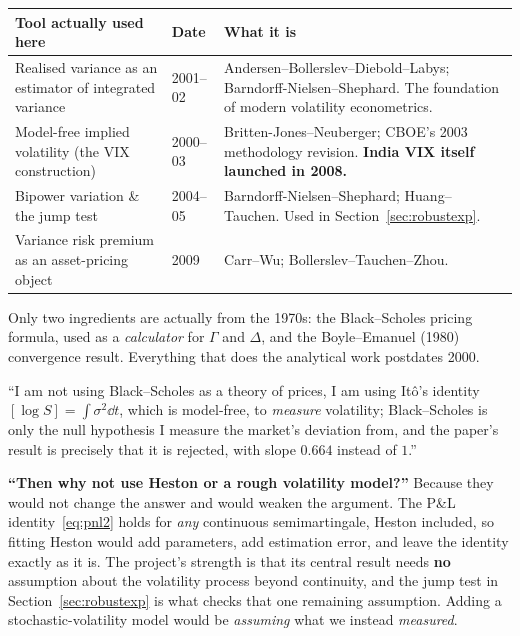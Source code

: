 \documentclass[11pt,a4paper]{article}
\begin{document}
\begin{keybox}
\begin{table}[H]
\centering\small
\begin{tabular}{L{6.2cm}L{1.9cm}L{6.9cm}}
\toprule
\textbf{Tool actually used here} & \textbf{Date} & \textbf{What it is} \\
\midrule
Realised variance as an estimator of integrated variance & 2001--02 &
Andersen--Bollerslev--Diebold--Labys; Barndorff-Nielsen--Shephard. The foundation of modern
volatility econometrics. \\
Model-free implied volatility (the VIX construction) & 2000--03 &
Britten-Jones--Neuberger; CBOE's 2003 methodology revision. \textbf{India VIX itself launched
in 2008.} \\
Bipower variation \& the jump test & 2004--05 &
Barndorff-Nielsen--Shephard; Huang--Tauchen. Used in Section~\ref{sec:robustexp}. \\
Variance risk premium as an asset-pricing object & 2009 &
Carr--Wu; Bollerslev--Tauchen--Zhou. \\
\bottomrule
\end{tabular}
\end{table}
\vspace{-6pt}
Only two ingredients are actually from the 1970s: the Black--Scholes pricing formula, used as
a \emph{calculator} for $\Gamma$ and $\Delta$, and the Boyle--Emanuel (1980) convergence
result. Everything that does the analytical work postdates 2000.
\end{keybox}

\begin{saybox}
``I am not using Black--Scholes as a theory of prices, I am using It\^o's identity
$[\log S]=\int\sigma^2\dd t$, which is model-free, to \emph{measure} volatility; Black--Scholes
is only the null hypothesis I measure the market's deviation from, and the paper's result is
precisely that it is rejected, with slope $0.664$ instead of $1$.''
\end{saybox}

\begin{trapbox}
\textbf{``Then why not use Heston or a rough volatility model?''}
\smallskip
Because they would not change the answer and would weaken the argument. The P\&L
identity~\eqref{eq:pnl2} holds for \emph{any} continuous semimartingale, Heston included,
so fitting Heston would add parameters, add estimation error, and leave the identity exactly as
it is. The project's strength is that its central result needs \textbf{no} assumption about the
volatility process beyond continuity, and the jump test in Section~\ref{sec:robustexp} is what
checks that one remaining assumption. Adding a stochastic-volatility model would be
\emph{assuming} what we instead \emph{measured}.
\end{trapbox}
\end{document}
